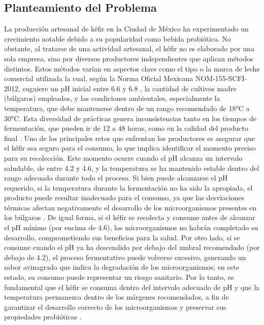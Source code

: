 \subsection{Planteamiento del Problema}

La producción artesanal de kéfir en la Ciudad de México ha experimentado un
crecimiento notable debido a su popularidad como bebida probiótica. No obstante,
al tratarse de una actividad artesanal, el kéfir no es elaborado por una sola empresa,
sino por diversos productores independientes que aplican métodos distintos. Estos
métodos varían en aspectos clave como el tipo o la marca de leche comercial
utilizada la cual, según la Norma Oficial Mexicana NOM-155-SCFI-2012, suguiere un
pH inicial entre 6.6 y 6.8 \cite{zotero-item-119}, la cantidad de cultivos madre (búlgaros) empleados, y
las condiciones ambientales, especialmente la temperatura, que debe mantenerse
dentro de un rango recomendado de 18°C a 30°C. Esta diversidad de prácticas
genera inconsistencias tanto en los tiempos de fermentación, que pueden ir de 12
a 48 horas, como en la calidad del producto final \cite{Fitrianingsih2022}.\newline
Uno de los principales retos que enfrentan los productores es asegurar que el kéfir
sea seguro para el consumo, lo que implica identificar el momento preciso para su
recolección. Este momento ocurre cuando el pH alcanza un intervalo saludable, de
entre 4.2 y 4.6, y la temperatura se ha mantenido estable dentro del rango adecuado
durante todo el proceso. Si bien puede alcanzarse el pH requerido, si la temperatura
durante la fermentación no ha sido la apropiada, el producto puede resultar
inadecuado para el consumo, ya que las desviaciones térmicas afectan
negativamente el desarrollo de los microorganismos presentes en los búlgaros \cite{ArevaloOrtiz2007}.
De igual forma, si el kéfir se recolecta y consume antes de alcanzar el pH mínimo
(por encima de 4.6), los microorganismos no habrán completado su desarrollo,
comprometiendo sus beneficios para la salud. Por otro lado, si se consume cuando
el pH ya ha descendido por debajo del umbral recomendado (por debajo de 4.2), el
proceso fermentativo puede volverse excesivo, generando un sabor avinagrado que
indica la degradación de los microorganismos; en este estado, su consumo puede
representar un riesgo sanitario. Por lo tanto, es fundamental que el kéfir se consuma
dentro del intervalo adecuado de pH y que la temperatura permanezca dentro de
los márgenes recomendados, a fin de garantizar el desarrollo correcto de los
microorganismos y preservar sus propiedades probióticas \cite{Araujo-Osorio}.\newline
